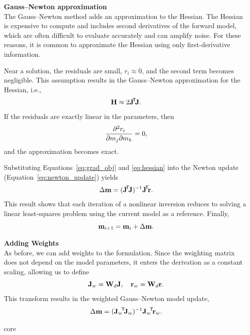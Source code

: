{    \medskip
    \noindent\textbf{Gauss--Newton approximation} \\
    The Gauss--Newton method adds an approximation to the Hessian.  The Hessian is expensive to compute and includes second derivatives of the forward model, which are often difficult to evaluate accurately and can amplify noise.  For these reasons, it is common to approximate the Hessian using only first-derivative information.

    Near a solution, the residuals are small, $r_i \approx 0$, and the second term becomes negligible.  This assumption results in the Gauss--Newton approximation for the Hessian, i.e.,
    \begin{equation}
        \vb{H} \approx 2 \vb{J}\!^\mathsf{T}\! \vb{J}.
        \label{eq:hessian}
    \end{equation}
    If the residuals are exactly linear in the parameters, then
    \[
        \pdv{r_i}{m_j}{m_k} = 0,
    \]
    and the approximation becomes exact.

    Substituting Equations~\ref{eq:grad_obj} and \ref{eq:hessian} into the Newton update (Equation~\ref{eq:newton_update}) yields
    \[
        \Delta \vb{m} = (\vb{J}\!^\mathsf{T}\! \vb{J})^{-1} \vb{J}\!^\mathsf{T}\! \vb{r}.
    \]
    This result shows that each iteration of a nonlinear inversion reduces to solving a linear least-squares problem using the current model as a reference.  Finally,
    \[
        \vb{m}_{i+1} = \vb{m}_i + \Delta \vb{m}.
    \]

    \medskip
    \noindent\textbf{Adding Weights}\\
    As before, we can add weights to the formulation.  Since the weighting matrix does not depend on the model parameters, it enters the derivation as a constant scaling, allowing us to define
    \[
        \vb{J}_w = \vb{W}_d \vb{J}, \quad
        \vb{r}_w = \vb{W}_d \vb{r}.
    \]
    This transform results in the weighted Gauss--Newton model update,
    \[
        \Delta \vb{m} = (\vb{J}_w\!^\mathsf{T}\! \vb{J}_w)^{-1} \vb{J}_w\!^\mathsf{T}\! \vb{r}_w.
    \]
}{core}\label{box:newton}